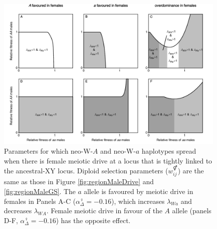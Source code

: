 \documentclass[12pt]{article}
\begin{document}
\begin{figure}[!h]
\centering
\centerline{\includegraphics[width=\linewidth]{Region_Plot_combined_FemaleDrive}}
\caption{
Parameters for which neo-W-$A$ and neo-W-$a$ haplotypes spread when there is female meiotic drive at a locus that is tightly linked to the ancestral-XY locus.
Diploid selection parameters ($w_{ij}^\Hermaphrodite$) are the same as those in Figure \ref{fig:regionMaleDrive} and \ref{fig:regionMaleGS}. 
The $a$ allele is favoured by meiotic drive in females in Panels A-C ($\alpha_{\Delta}^\female=-0.16$), which increases $\lambda_{Wa}$ and decreases $\lambda_{WA}$. 
Female meiotic drive in favour of the $A$ allele (panels D-F, $\alpha_{\Delta}^\female=-0.16$) has the opposite effect. 
}
\label{fig:regionFemaleDrive}
\end{figure}
\end{document}
